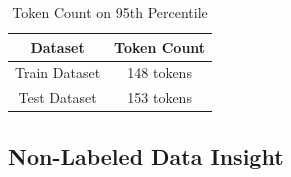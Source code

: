 \documentclass[12pt, a4paper]{article}
\begin{document}
                    \begin{table}[h]
                        \centering
                        \begin{tabular}{|c|c|}
                            \hline
                            \rule{0pt}{2.5ex}
                            \textbf{Dataset} & \textbf{Token Count} \\
                            \hline \hline
                            Train Dataset & 148 tokens \\
                            Test Dataset & 153 tokens \\
                            \hline
                        \end{tabular}
                        \caption{Token Count on 95th Percentile}
                    \end{table}

    \pagebreak

            \subsection{Non-Labeled Data Insight}
\end{document}

